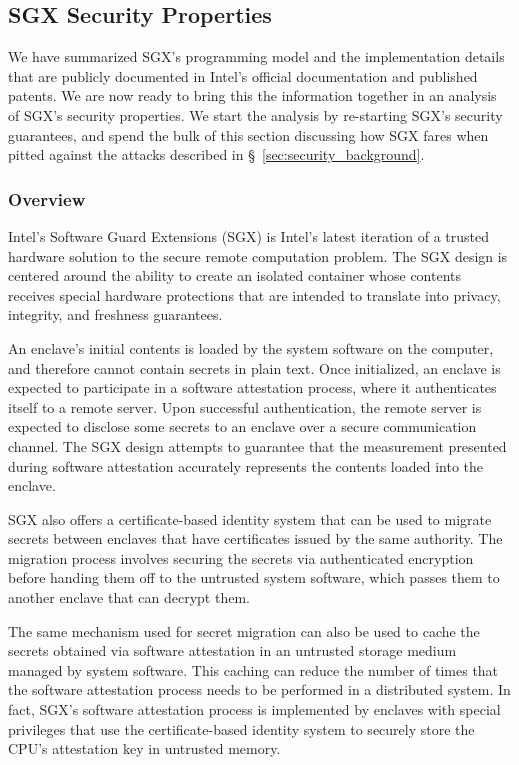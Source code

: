 \subsection{SGX Security Properties}
\label{sec:sgx_security_analysis}

We have summarized SGX's programming model and the implementation details
that are publicly documented in Intel's official documentation and published
patents. We are now ready to bring this the information together in an analysis
of SGX's security properties. We start the analysis by re-starting SGX's
security guarantees, and spend the bulk of this section discussing how SGX
fares when pitted against the attacks described in
\S~\ref{sec:security_background}.


\subsubsection{Overview}

Intel's Software Guard Extensions (SGX) is Intel's latest iteration of a
trusted hardware solution to the secure remote computation problem. The SGX
design is centered around the ability to create an isolated container whose
contents receives special hardware protections that are intended to translate
into privacy, integrity, and freshness guarantees.


An enclave's initial contents is loaded by the system software on the computer,
and therefore cannot contain secrets in plain text. Once initialized, an
enclave is expected to participate in a software attestation process, where it
authenticates itself to a remote server. Upon successful authentication, the
remote server is expected to disclose some secrets to an enclave over a
secure communication channel. The SGX design attempts to guarantee that the
measurement presented during software attestation accurately represents the
contents loaded into the enclave.

SGX also offers a certificate-based identity system that can be used to migrate
secrets between enclaves that have certificates issued by the same authority.
The migration process involves securing the secrets via authenticated
encryption before handing them off to the untrusted system software, which
passes them to another enclave that can decrypt them.

The same mechanism used for secret migration can also be used to cache the
secrets obtained via software attestation in an untrusted storage medium
managed by system software. This caching can reduce the number of times that
the software attestation process needs to be performed in a distributed system.
In fact, SGX's software attestation process is implemented by enclaves with
special privileges that use the certificate-based identity system to securely
store the CPU's attestation key in untrusted memory.


